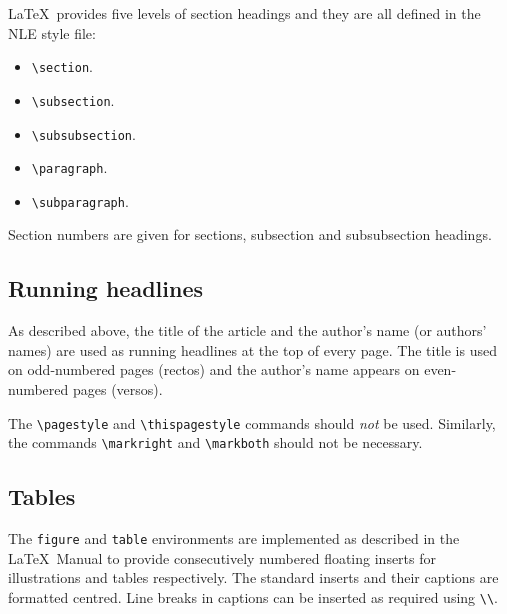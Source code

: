 \documentclass{cnle}
\begin{document}
\LaTeX\ provides five levels of section headings and they are all
defined in the NLE style file:
\begin{itemize}
  \item \verb"\section".
  \item \verb"\subsection".
  \item \verb"\subsubsection".
  \item \verb"\paragraph".
  \item \verb"\subparagraph".
\end{itemize}
Section numbers are given for sections, subsection and subsubsection headings.

\subsection{Running headlines}

As described above, the title of the article and the author's name (or authors'
names) are used as running headlines at the top of every page.
The title is used on odd-numbered pages (rectos) and the author's name appears
on even-numbered pages (versos).

The \verb"\pagestyle" and \verb"\thispagestyle" commands should {\em not\/} be
used.
Similarly, the commands \verb"\markright" and \verb"\markboth" should not be
necessary.


\subsection{Tables}

The {\tt figure} and {\tt table} environments are implemented as described in
the \LaTeX\ Manual to
provide consecutively numbered floating inserts for illustrations and tables
respectively.
The standard inserts and their captions are formatted centred.
Line breaks in captions can be inserted as required using \verb"\\".
\end{document}

